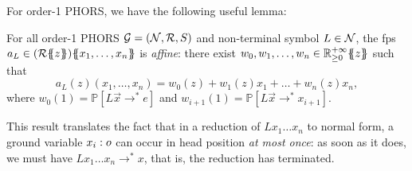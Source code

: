   
 For order-1 PHORS, we have the following useful lemma:
\begin{lemma}\label{lemma:affine}
For all order-1 PHORS $\mathcal{G}=(\mathcal{N}, \mathcal{R},S)$ and non-terminal symbol $L\in \mathcal{N}$, the fps $a_L\in \fps{(\fps{\Rsemiring}{z})}{x_1,\dots, x_n}$ is \emph{affine}:
%
 there exist $w_0,w_1,\dots, w_n\in{\mathbb{R}^{+\infty}_{\geq 0}}\{\!\!\{z\}\!\!\}$ such that
\[
a_{L}(z)(x_1,\dots, x_n)
=w_0(z)+w_1(z)x_1+\dots+w_n(z)x_n,
\]
where $w_0(1)=\mathbb P[L\vec x\to^* e]$ and
$w_{i+1}(1)=\mathbb P[L\vec x\to^* x_{i+1}]$.
\end{lemma}
This result translates the fact that in a reduction of $Lx_1\dots x_n$ to normal form, a ground variable $x_i:o$ can occur in head position \emph{at most once}: as soon as it does, we must have $Lx_1\dots x_n\to^* x$, that is, the reduction has terminated.



%  
  
  
  